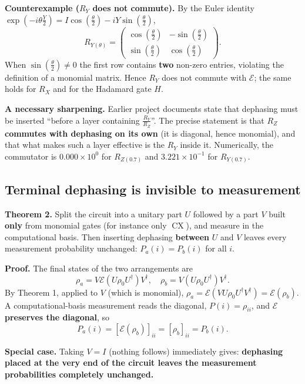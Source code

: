\documentclass{article}
\begin{document}
\textbf{Counterexample (\(R_{Y}\) does not commute).} By the Euler
identity
\(\exp( - i\theta\frac{Y}{2}) = I\cos(\frac{\theta}{2}) - iY\sin(\frac{\theta}{2})\),
\[R_{Y(\theta)} = \begin{pmatrix}
\cos(\frac{\theta}{2}) & - \sin(\frac{\theta}{2}) \\
\sin(\frac{\theta}{2}) & \cos(\frac{\theta}{2})
\end{pmatrix}.\] When \(\sin(\frac{\theta}{2}) \neq 0\) the first row
contains \textbf{two} non-zero entries, violating the definition of a
monomial matrix. Hence \(R_{Y}\) does not commute with \(\mathcal{E}\);
the same holds for \(R_{X}\) and for the Hadamard gate \(H\).

\textbf{A necessary sharpening.} Earlier project documents state that
dephasing must be inserted ``before a layer containing
\(\frac{R_{Y}}{R_{Z}}\)''. The precise statement is that
\textbf{\(R_{Z}\) commutes with dephasing on its own} (it is diagonal,
hence monomial), and that what makes such a layer effective is the
\(R_{Y}\) inside it. Numerically, the commutator is
\(0.000 \times 10^{0}\) for \(R_{Z(0.7)}\) and \(3.221 \times 10^{- 1}\)
for \(R_{Y(0.7)}\).

\subsection{Terminal dephasing is invisible to measurement}

\textbf{Theorem 2.} Split the circuit into a unitary part \(U\) followed
by a part \(V\) built \textbf{only} from monomial gates (for instance
only \(\operatorname{CX}\)), and measure in the computational basis.
Then inserting dephasing \textbf{between} \(U\) and \(V\) leaves every
measurement probability unchanged: \(P_{a}(i) = P_{b}(i)\) for all
\(i\).

\textbf{Proof.} The final states of the two arrangements are
\[\rho_{a} = V\mathcal{E}(U\rho_{0}U^{\dagger})V^{\dagger},\quad\rho_{b} = V\left( U\rho_{0}U^{\dagger} \right)V^{\dagger}.\]
By Theorem 1, applied to \(V\) (which is monomial),
\(\rho_{a} = \mathcal{E}(VU\rho_{0}U^{\dagger}V^{\dagger}) = \mathcal{E}(\rho_{b})\).
A computational-basis measurement reads the diagonal,
\(P(i) = \rho_{ii}\), and \(\mathcal{E}\) \textbf{preserves the
diagonal}, so
\[P_{a}(i) = \left\lbrack \mathcal{E}(\rho_{b}) \right\rbrack_{ii} = \left\lbrack \rho_{b} \right\rbrack_{ii} = P_{b}(i).\]

\textbf{Special case.} Taking \(V = I\) (nothing follows) immediately
gives: \textbf{dephasing placed at the very end of the circuit leaves
the measurement probabilities completely unchanged.}
\end{document}
